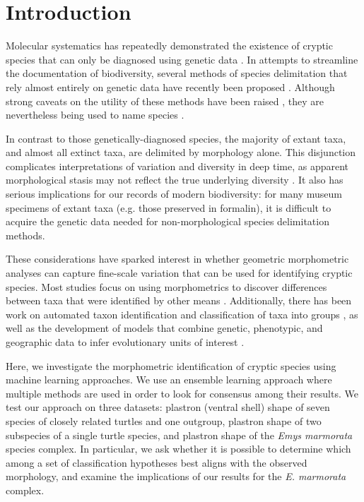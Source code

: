 \documentclass[10pt,letterpaper]{article}
\begin{document}
\section*{Introduction}

Molecular systematics has repeatedly demonstrated the existence of cryptic species that can only be diagnosed using genetic data \cite{Stuart2006,Bickford2007,SchlickSteiner2007,Pfenninger2007,Clare2011,Funk2012}. In attempts to streamline the documentation of biodiversity, several methods of species delimitation that rely almost entirely on genetic data have recently been proposed \cite{Pons2006,Carstens2010,Hausdorf2010,O'Meara2010,Yang2010b,Huelsenbeck2011b}. Although strong caveats on the utility of these methods have been raised \cite{Bauer2000,Carstens2013}, they are nevertheless being used to name species \cite{Leache2010,Spinks2014}.

In contrast to those genetically-diagnosed species, the majority of extant taxa, and almost all extinct taxa, are delimited by morphology alone. This disjunction complicates interpretations of variation and diversity in deep time, as apparent morphological stasis may not reflect the true underlying diversity \cite{Eldredge1972,Gould1977a,VanBocxlaer2013}. It also has serious implications for our records of modern biodiversity: for many museum specimens of extant taxa (e.g. those preserved in formalin), it is difficult to acquire the genetic data needed for non-morphological species delimitation methods.

These considerations have sparked interest in whether geometric morphometric analyses can capture fine-scale variation that can be used for identifying cryptic species. Most studies focus on using morphometrics to discover differences between taxa that were identified by other means \cite{Polly2003,Zelditch2004,Gaubert2005b,Gunduz2007,Polly2007a,Demandt2009,Markolf2013,Fruciano2016}. Additionally, there has been work on automated taxon identification and classification of taxa into groups \cite{Baylac2003,Dobigny2003,MacLeod2007,VandenBrink2011,Vitek2017}, as well as the development of models that combine genetic, phenotypic, and geographic data to infer evolutionary units of interest \cite{Guillot2012}.

Here, we investigate the morphometric identification of cryptic species using machine learning approaches. We use an ensemble learning approach where multiple methods are used in order to look for consensus among their results. We test our approach on three datasets: plastron (ventral shell) shape of seven species of closely related turtles and one outgroup, plastron shape of two subspecies of a single turtle species, and plastron shape of the \textit{Emys marmorata} species complex. In particular, we ask whether it is possible to determine which among a set of classification hypotheses best aligns with the observed morphology, and examine the implications of our results for the \textit{E. marmorata} complex. 
\end{document}
